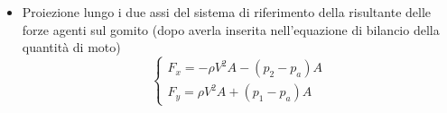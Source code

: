 \begin{itemize}
  \item Proiezione lungo i due assi del sistema di riferimento della risultante delle forze agenti sul gomito (dopo averla inserita nell'equazione di bilancio della quantità di moto)
\begin{equation}
  \begin{cases}
    F_x = - \rho V^2 A - (p_2 - p_a)A   \\
    F_y =  \rho V^2 A + (p_1 - p_a)A  
  \end{cases}
  \end{equation}
\end{itemize}
